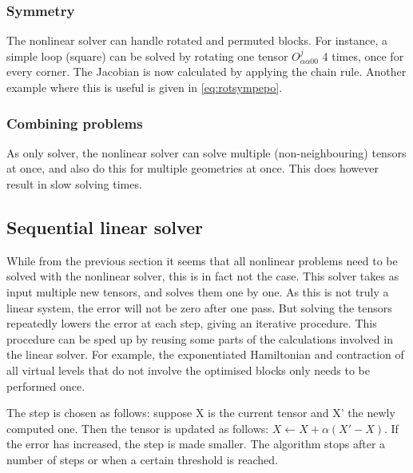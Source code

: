 
\subsubsection{Symmetry}

The nonlinear solver can handle rotated and permuted blocks. For instance, a simple loop (square) can be solved by rotating one tensor $O^{j }_{ \alpha \alpha 0 0}$ 4 times, once for every corner. The Jacobian is now calculated by applying the chain rule. Another example where this is useful is given in \cref{eq:rotsympepo}.

\subsubsection{Combining problems}
As only solver, the nonlinear solver can solve multiple (non-neighbouring) tensors at once, and also do this for multiple geometries at once. This does however result in slow solving times.

\subsection{Sequential linear solver}
While from the previous section it seems that all nonlinear problems need to be solved with the nonlinear solver, this is in fact not the case. This solver takes as input multiple new tensors, and solves them one by one. As this is not truly a linear system, the error will not be zero after one pass. But solving the tensors repeatedly lowers the error at each step, giving an iterative procedure. This procedure can be sped up by reusing some parts of the calculations involved in the linear solver. For example, the exponentiated Hamiltonian and contraction of all virtual levels that do not involve the optimised blocks only needs to be performed once.

The step is chosen as follows: suppose X is the current tensor and X' the newly computed one. Then the tensor is updated as follows: $X \leftarrow X + \alpha (X'-X)$. If the error has increased, the step is made smaller. The algorithm stops after a number of steps or when a certain threshold is reached.

